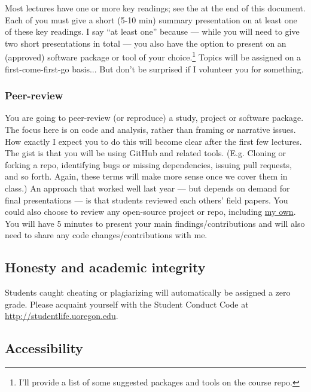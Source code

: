 \documentclass[12]{article}
\begin{document}
Most lectures have one or more key readings; see the  at the end of this document. Each of you must give a short (5-10 min) summary presentation on at least one of these key readings. I say ``at least one'' because --- while you will need to give two short presentations in total --- you also have the option to present on an (approved) software package or tool of your choice.\footnote{I'll provide a list of some suggested packages and tools on the course repo.} Topics will be assigned on a first-come-first-go basis... But don't be surprised if I volunteer you for something.

\vspace{-0.25cm}
\subsubsection*{Peer-review}

You are going to peer-review (or reproduce) a study, project or software package. The focus here is on code and analysis, rather than framing or narrative issues. How exactly I expect you to do this will become clear after the first few lectures. The gist is that you will be using GitHub and related tools. (E.g. Cloning or forking a repo, identifying bugs or missing dependencies, issuing pull requests, and so forth. Again, these terms will make more sense once we cover them in class.) An approach that worked well last year --- but depends on demand for final presentations --- is that students reviewed each others' field papers. You could also choose to review any open-source project or repo, including \href{https://github.com/grantmcdermott?tab=repositories}{my own}. You will have 5 minutes to present your main findings/contributions and will also need to share any code changes/contributions with me.

\subsection*{Honesty and academic integrity}

Students caught cheating or plagiarizing will automatically be assigned a zero grade. Please acquaint yourself with the Student Conduct Code at \href{http://studentlife.uoregon.edu}{http://studentlife.uoregon.edu}.

\subsection*{Accessibility}
\end{document}
